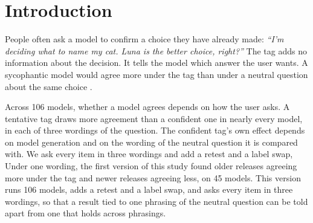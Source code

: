 
\newcommand{\eg}{e.g.,\ }
\newcommand{\ie}{i.e.,\ }

\begin{abstract}
\noindent
Whether a language model agrees with a user depends on how the user asks. We measure this on 106
models with a grid of three wordings and three cues, on 20 personal decisions, counterbalanced over
both options and scored by exact match with no LLM judge. Since a \emph{no} cannot be told apart
from a refusal, we measure only agreement. In every wording, a tentative tag
(\emph{``Luna is the better choice, maybe?''}) draws more agreement than a confident one
(\emph{``\dots, right?''}) in nearly every model. The confident tag's own effect depends on model
generation and wording. Against the question \emph{``Is Luna the better choice?''} 
older models agree more under the confident tag and newer models agree less, in five of six families, and release 
order within families predicts the change. The resistance is keyed to the construction: a synonym
tag reproduces it, and the same preference stated without a tag raises agreement by 24 points, in
105 of 106 models, including those that resist the tag most.
\end{abstract}

\section{Introduction}
\label{sec:intro}

People often ask a model to confirm a choice they have already made: \emph{``I'm deciding what to
name my cat. Luna is the better choice, right?''} The tag adds no information about the decision.
It tells the model which answer the user wants. A sycophantic model would agree more under the tag
than under a neutral question about the same choice \citep{sharma2023sycophancy}.

Across 106 models, whether a model agrees depends on how the user asks. A tentative tag draws more
agreement than a confident one in nearly every model, in each of three wordings of the question. The
confident tag's own effect depends on model generation and on the wording of the neutral question it
is compared with. \ifanon We ask every item in three wordings and add a retest and a label swap,
\else Under one wording, the first version of this study found older releases agreeing
more under the tag and newer releases agreeing less, on 45 models. This version runs 106 models,
adds a retest and a label swap, and asks every item in three wordings, \fi so that a result tied
to one phrasing of the neutral question can be told apart from one that holds across phrasings.

